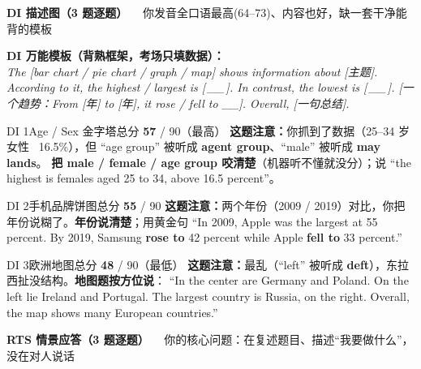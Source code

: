 \documentclass[11pt]{article}
\newcommand{\spart}[1]{\textcolor{cPartial}{\bfseries #1}}
\newcommand{\hl}[1]{\textcolor{cWrong}{\bfseries #1}}   %
\newcommand{\ptetask}[2]{%
  \needspace{4\baselineskip}\medskip
  \begin{tcolorbox}[enhanced, colback=cHead, colframe=cHead, sharp corners,
     left=12pt, right=12pt, top=5pt, bottom=5pt, boxrule=0pt]
    {\large\bfseries\color{white} #1}\ \ {\color{white!80} #2}
  \end{tcolorbox}\smallskip}
\begin{document}
\ptetask{DI 描述图（3 题逐题）}{你发音全口语最高(64–73)、内容也好，缺一套干净能背的模板}

\begin{notebox}\small
\textbf{DI 万能模板（背熟框架，考场只填数据）：}\\
\emph{The [bar chart / pie chart / graph / map] shows information about [主题]. According to it, the highest / largest is [\,\_\_\,]. In contrast, the lowest is [\,\_\_\,]. [一个趋势：From [年] to [年], it rose / fell to \_\_]. Overall, [一句总结].}
\end{notebox}

\begin{qblock}{DI 1\quad Age / Sex 金字塔}{总分 \spart{57} / 90（最高）}
\textbf{这题注意：}你抓到了数据（25–34 岁女性 ~16.5\%），但 ``age group'' 被听成 \hl{agent group}、``male'' 被听成 \hl{may lands}。
\textbf{把 male / female / age group 咬清楚}（机器听不懂就没分）；说 ``the highest is females aged 25 to 34, above 16.5 percent''。
\end{qblock}

\begin{qblock}{DI 2\quad 手机品牌饼图}{总分 \spart{55} / 90}
\textbf{这题注意：}两个年份（2009 / 2019）对比，你把年份说糊了。\textbf{年份说清楚}；用黄金句
``In 2009, Apple was the largest at 55 percent. By 2019, Samsung \textbf{rose to} 42 percent while Apple \textbf{fell to} 33 percent.''
\end{qblock}

\begin{qblock}{DI 3\quad 欧洲地图}{总分 \spart{48} / 90（最低）}
\textbf{这题注意：}最乱（``left'' 被听成 \hl{deft}），东拉西扯没结构。\textbf{地图题按方位说}：
``In the center are Germany and Poland. On the left lie Ireland and Portugal. The largest country is Russia, on the right. Overall, the map shows many European countries.''
\end{qblock}

\ptetask{RTS 情景应答（3 题逐题）}{你的核心问题：在复述题目、描述“我要做什么”，没在对人说话}
\end{document}
